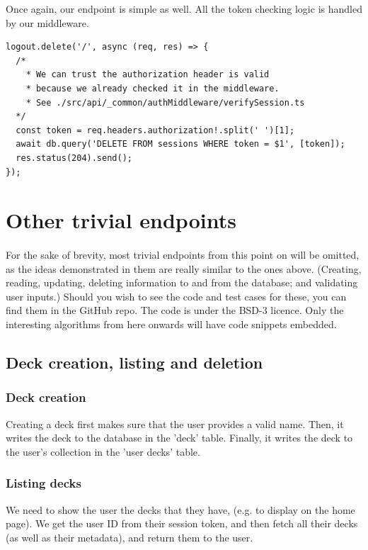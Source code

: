 \documentclass{report}
\begin{document}
Once again, our endpoint is simple as well. All the token checking logic is handled by our middleware.

\begin{verbatim}
logout.delete('/', async (req, res) => {
  /*
    * We can trust the authorization header is valid
    * because we already checked it in the middleware.
    * See ./src/api/_common/authMiddleware/verifySession.ts
  */
  const token = req.headers.authorization!.split(' ')[1];
  await db.query('DELETE FROM sessions WHERE token = $1', [token]);
  res.status(204).send();
});
\end{verbatim}

\section{Other trivial endpoints}
\paragraph{}
For the sake of brevity, most trivial endpoints from this point on will be omitted, as the ideas demonstrated in them are really similar to the ones above. (Creating, reading, updating, deleting information to and from the database; and validating user inputs.) Should you wish to see the code and test cases for these, you can find them in the GitHub repo. The code is under the BSD-3 licence. Only the interesting algorithms from here onwards will have code snippets embedded.

\subsection{Deck creation, listing and deletion}
\subsubsection{Deck creation}
Creating a deck first makes sure that the user provides a valid name. Then, it writes the deck to the database in the 'deck' table. Finally, it writes the deck to the user's collection in the 'user decks' table.

\subsubsection{Listing decks}
We need to show the user the decks that they have, (e.g. to display on the home page). We get the user ID from their session token, and then fetch all their decks (as well as their metadata), and return them to the user.
\end{document}
